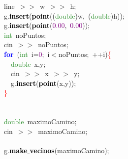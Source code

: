 \documentclass[10pt,a4paper,twoside]{article}
\begin{document}
{{{{{\mbox{}\ \ \ \ line\ \textcolor{BrickRed}{$>>$}\ w\ \textcolor{BrickRed}{$>>$}\ h\textcolor{BrickRed}{;} \\
\mbox{}\ \ \ \ g\textcolor{BrickRed}{.}\textbf{\textcolor{Black}{insert}}\textcolor{BrickRed}{(}\textbf{\textcolor{Black}{point}}\textcolor{BrickRed}{((}\textcolor{ForestGreen}{double}\textcolor{BrickRed}{)}w\textcolor{BrickRed}{,}\ \textcolor{BrickRed}{(}\textcolor{ForestGreen}{double}\textcolor{BrickRed}{)}h\textcolor{BrickRed}{));} \\
\mbox{}\ \ \ \ g\textcolor{BrickRed}{.}\textbf{\textcolor{Black}{insert}}\textcolor{BrickRed}{(}\textbf{\textcolor{Black}{point}}\textcolor{BrickRed}{(}\textcolor{Purple}{0.00}\textcolor{BrickRed}{,}\ \textcolor{Purple}{0.00}\textcolor{BrickRed}{));} \\
\mbox{}\ \ \ \ \textcolor{ForestGreen}{int}\ noPuntos\textcolor{BrickRed}{;} \\
\mbox{}\ \ \ \ cin\ \textcolor{BrickRed}{$>>$}\ noPuntos\textcolor{BrickRed}{;} \\
\mbox{}\ \ \ \ \textbf{\textcolor{Blue}{for}}\ \textcolor{BrickRed}{(}\textcolor{ForestGreen}{int}\ i\textcolor{BrickRed}{=}\textcolor{Purple}{0}\textcolor{BrickRed}{;}\ i\textcolor{BrickRed}{$<$}noPuntos\textcolor{BrickRed}{;}\ \textcolor{BrickRed}{++}i\textcolor{BrickRed}{)}\textcolor{Red}{\{} \\
\mbox{}\ \ \ \ \ \ \textcolor{ForestGreen}{double}\ x\textcolor{BrickRed}{,}y\textcolor{BrickRed}{;} \\
\mbox{}\ \ \ \ \ \ cin\ \textcolor{BrickRed}{$>>$}\ x\ \textcolor{BrickRed}{$>>$}\ y\textcolor{BrickRed}{;} \\
\mbox{}\ \ \ \ \ \ g\textcolor{BrickRed}{.}\textbf{\textcolor{Black}{insert}}\textcolor{BrickRed}{(}\textbf{\textcolor{Black}{point}}\textcolor{BrickRed}{(}x\textcolor{BrickRed}{,}y\textcolor{BrickRed}{));} \\
\mbox{}\ \ \ \ \textcolor{Red}{\}} \\
\mbox{} \\
\mbox{}\ \  \\
\mbox{}\ \ \ \ \textcolor{ForestGreen}{double}\ maximoCamino\textcolor{BrickRed}{;} \\
\mbox{}\ \ \ \ cin\ \textcolor{BrickRed}{$>>$}\ maximoCamino\textcolor{BrickRed}{;} \\
\mbox{} \\
\mbox{}\ \ \ \ g\textcolor{BrickRed}{.}\textbf{\textcolor{Black}{make$\_$vecinos}}\textcolor{BrickRed}{(}maximoCamino\textcolor{BrickRed}{);} \\
}}}}}
\end{document}
